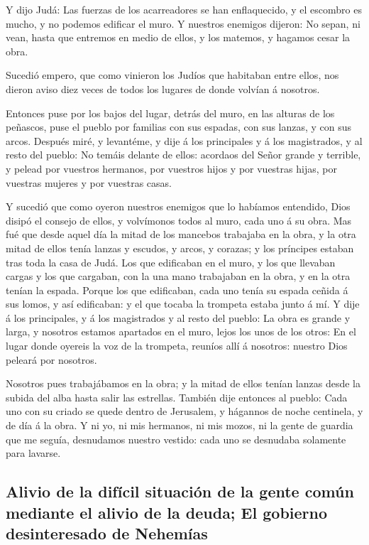  Y dijo Judá: Las fuerzas de los acarreadores se han
enflaquecido, y el escombro es mucho, y no podemos edificar el muro.
 Y nuestros enemigos dijeron: No sepan, ni vean, hasta
que entremos en medio de ellos, y los matemos, y hagamos cesar la obra.

 Sucedió empero, que como vinieron los Judíos que
habitaban entre ellos, nos dieron aviso diez veces de todos los lugares
de donde volvían á nosotros.

 Entonces puse por los bajos del lugar, detrás del muro,
en las alturas de los peñascos, puse el pueblo por familias con sus
espadas, con sus lanzas, y con sus arcos.  Después miré,
y levantéme, y dije á los principales y á los magistrados, y al resto
del pueblo: No temáis delante de ellos: acordaos del Señor grande y
terrible, y pelead por vuestros hermanos, por vuestros hijos y por
vuestras hijas, por vuestras mujeres y por vuestras casas.

 Y sucedió que como oyeron nuestros enemigos que lo
habíamos entendido, Dios disipó el consejo de ellos, y volvímonos todos
al muro, cada uno á su obra.  Mas fué que desde aquel día
la mitad de los mancebos trabajaba en la obra, y la otra mitad de ellos
tenía lanzas y escudos, y arcos, y corazas; y los príncipes estaban tras
toda la casa de Judá.  Los que edificaban en el muro, y
los que llevaban cargas y los que cargaban, con la una mano trabajaban
en la obra, y en la otra tenían la espada.  Porque los
que edificaban, cada uno tenía su espada ceñida á sus lomos, y así
edificaban: y el que tocaba la trompeta estaba junto á mí.
 Y dije á los principales, y á los magistrados y al resto
del pueblo: La obra es grande y larga, y nosotros estamos apartados en
el muro, lejos los unos de los otros:  En el lugar donde
oyereis la voz de la trompeta, reuníos allí á nosotros: nuestro Dios
peleará por nosotros.

 Nosotros pues trabajábamos en la obra; y la mitad de
ellos tenían lanzas desde la subida del alba hasta salir las estrellas.
 También dije entonces al pueblo: Cada uno con su criado
se quede dentro de Jerusalem, y hágannos de noche centinela, y de día á
la obra.  Y ni yo, ni mis hermanos, ni mis mozos, ni la
gente de guardia que me seguía, desnudamos nuestro vestido: cada uno se
desnudaba solamente para lavarse.

\hypertarget{alivio-de-la-difuxedcil-situaciuxf3n-de-la-gente-comuxfan-mediante-el-alivio-de-la-deuda-el-gobierno-desinteresado-de-nehemuxedas}{%
\subsection{Alivio de la difícil situación de la gente común mediante el
alivio de la deuda; El gobierno desinteresado de
Nehemías}\label{alivio-de-la-difuxedcil-situaciuxf3n-de-la-gente-comuxfan-mediante-el-alivio-de-la-deuda-el-gobierno-desinteresado-de-nehemuxedas}}

